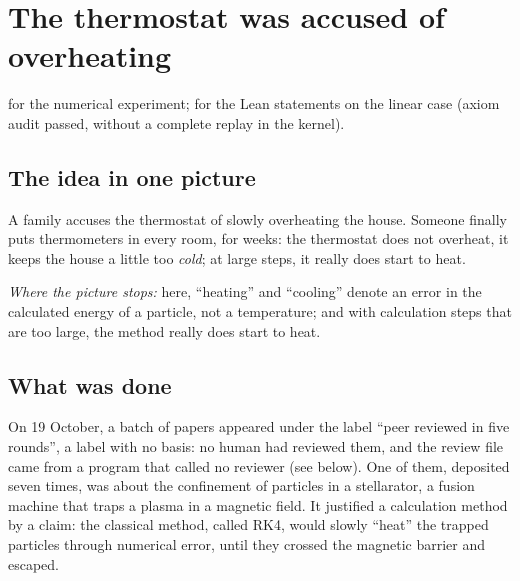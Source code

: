 \chapter[The thermostat on trial]{The thermostat was accused of overheating}

\noindent{} for the numerical experiment;  for the Lean statements on the linear case (axiom
audit passed, without a complete replay in the kernel).

\section*{The idea in one picture}

\begin{analogie}
A family accuses the thermostat of slowly overheating the house. Someone finally puts thermometers in every room,
for weeks: the thermostat does not overheat, it keeps the house a little too \emph{cold}; at large steps, it really
does start to heat.

\emph{Where the picture stops:} here, ``heating'' and ``cooling'' denote an error in the calculated energy of a
particle, not a temperature; and with calculation steps that are too large, the method really does start to heat.
\end{analogie}

\section*{What was done}

On 19 October, a batch of papers appeared under the label ``peer reviewed in five rounds'', a label with no basis:
no human had reviewed them, and the review file came from a program that called no reviewer
(see below). One of them, deposited
seven times, was about the confinement of particles in a stellarator, a fusion machine that traps a plasma in a
magnetic field. It justified a calculation method by a claim: the classical method, called RK4, would slowly
``heat'' the trapped particles through numerical error, until they crossed the magnetic barrier and escaped.

